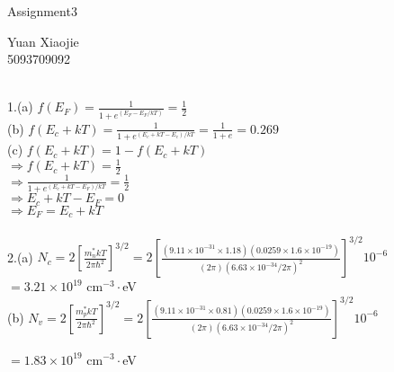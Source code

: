 \documentclass[11pt,oneside,a4paper]{article}
\begin{document}
\begin{center}Assignment3\\\end{center} 
\begin{flushright}Yuan Xiaojie\\5093709092\\\end{flushright} 

\ \\

1.\:(a) \(f(E_F)=\frac{1}{1+e^{(E_F-E_F/kT)}}=\frac{1}{2}\) \\ 

\quad (b) \(f(E_c+kT)=\frac{1}{1+e^{(E_c+kT-E_c)/kT}}=\frac{1}{1+e}=0.269\) \\

\quad (c) \(f(E_c+kT)=1-f(E_c+kT)\) \\

\hspace{8.5mm} \(\Rightarrow f(E_c+kT)=\frac{1}{2}\) \\

\hspace{8.5mm} \(\Rightarrow \frac{1}{1+e^{(E_c+kT-E_F)/kT}}=\frac{1}{2}\) \\

\hspace{8.5mm} \(\Rightarrow E_c+kT-E_F=0\) \\

\hspace{8.5mm} \(\Rightarrow E_F=E_c+kT \) \\
\\

2.\:(a) \(N_c=2\left[\frac{m_n^*kT}{2\pi\hbar^2}\right]^{3/2} = 2\left[\frac{(9.11\times10^{-31}\times1.18)(0.0259\times1.6\times10^{-19})}{(2\pi)(6.63\times10^{-34}/2\pi)^2}\right]^{3/2}10^{-6}\) \\

\hspace{15mm} \(=3.21\times10^{19}\) cm\(^{-3}\cdot\)eV \\

\quad (b) \(N_v=2\left[\frac{m_p^*kT}{2\pi\hbar^2}\right]^{3/2}=2\left[\frac{(9.11\times10^{-31}\times0.81)(0.0259\times1.6\times10^{-19})}{(2\pi)(6.63\times10^{-34}/2\pi)^2}\right]^{3/2}10^{-6}\)

\hspace{15mm} \(=1.83\times10^{19}\) cm\(^{-3}\cdot\)eV \\
\\
\end{document}
